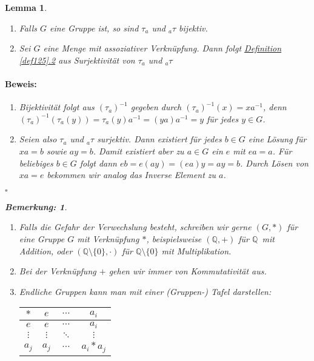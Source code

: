 \documentclass{report}
\newcommand{\Q}{\mathbb{Q}}
\newcommand{\mQ}{$\mathbb{Q}$\ }
\theoremstyle{customrem}
\newtheorem*{bem}{Bemerkung:}
\theoremstyle{customdef}
\newtheorem{lemma}[definition]{Lemma}
\renewenvironment{proof}{\vspace{-.75cm}\paragraph{Beweis: }}{\vspace{-.5cm}\hfill$\square$}
\begin{document}
	\begin{lemma}$ $\vspace{-.75cm}
		\label{lem128}
		\begin{enumerate}
			\item Falls $G$ eine Gruppe ist, so sind $\tau_a$ und $_{a}\tau$ bijektiv.
			\item Sei $G$ eine Menge mit assoziativer Verknüpfung. Dann folgt \hyperref[def125]{Definition \ref{def125}.2} aus Surjektivität von $\tau_a$ und $_{a}\tau$
		\end{enumerate}
		\vspace{.25cm}
		\begin{proof}
			\begin{enumerate}
				\item Bijektivität folgt aus  $(\tau_a)^{-1}$ gegeben durch $(\tau_a)^{-1}(x) = x a^{-1}$, denn $(\tau_a)^{-1}(\tau_a(y)) = \tau_a(y)a^{-1} = (y a) a^{-1} = y$ für jedes $y \in G$.
				\item Seien also $\tau_a$ und $_{a}\tau$ surjektiv. Dann existiert für jedes $b \in G$ eine Lösung für 
				$x a = b$ sowie $a y = b$. 
				Damit existiert aber zu $a \in G$ ein  $e$ mit $ea = a$. Für beliebiges $b \in G$ folgt dann $e b = e (a y) = (e a) y = ay = b$.	Durch Lösen von $x a = e$ bekommen wir analog das Inverse Element zu $a$.
			\end{enumerate}
		\end{proof}
		\vspace{.25cm}
		\begin{bem}$ $
			\begin{enumerate}
				\item Falls die Gefahr der Verwechslung besteht, schreiben wir gerne $(G, \ast)$ für eine Gruppe $G$ mit Verknüpfung $\ast$, 
					beispielsweise $(\Q, +)$ für \mQ mit Addition, oder $(\Q \setminus \{0\}, \cdot)$ für $\Q \setminus \{0\}$ mit Multiplikation.
				\item Bei der Verknüpfung $+$ gehen wir immer von Kommutativität aus.
				\item Endliche Gruppen kann man mit einer (Gruppen-) Tafel darstellen:
				\begin{center}
					\begin{tabular}{c || c  c  c}
						$\ast$   & $e$      & $\cdots$ & $a_i$	    \\\hline\hline
						$e$      & $e$      & $\cdots$	& $a_i$     \\
						$\vdots$ & $\vdots$ & $\ddots$	& $\vdots$  \\
						$a_j$ 	 &$a_j$     & $\cdots$	& $a_i * a_j$

\end{tabular}
\end{center}
\end{enumerate}
\end{bem}
\end{lemma}
\end{document}
